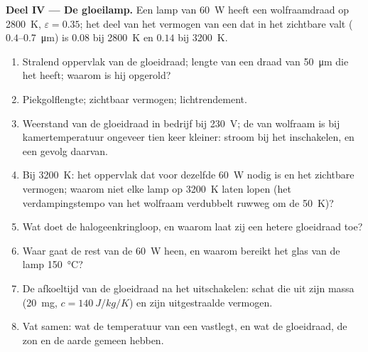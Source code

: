 \begin{problem}
\textbf{Deel IV --- De gloeilamp.}
Een lamp van \qty{60}{W} heeft een wolfraamdraad op \qty{2800}{K},
$\varepsilon = 0.35$; het deel van het vermogen van een  dat in
het zichtbare valt ($0.4$--\qty{0.7}{\micro m}) is $0.08$ bij \qty{2800}{K}
en $0.14$
bij \qty{3200}{K}.
\begin{enumerate}[resume]
  \item Stralend oppervlak van de gloeidraad; lengte van een draad van
        \qty{50}{\micro m}
        die het heeft; waarom is hij opgerold?
  \item Piekgolflengte; zichtbaar vermogen; lichtrendement.
  \item Weerstand van de gloeidraad in bedrijf bij \qty{230}{V};
        de  van wolfraam is bij kamertemperatuur
        ongeveer tien keer kleiner:
        stroom bij het inschakelen, en een gevolg daarvan.
  \item Bij \qty{3200}{K}: het oppervlak dat voor dezelfde \qty{60}{W} nodig is en
        het zichtbare vermogen; waarom niet elke lamp op \qty{3200}{K} laten lopen
        (het verdampingstempo van het wolfraam verdubbelt ruwweg om de
        \qty{50}{K})?
  \item Wat doet de halogeenkringloop, en waarom laat zij een hetere
        gloeidraad toe?
  \item Waar gaat de rest van de \qty{60}{W} heen, en waarom bereikt het glas
        van de lamp \qty{150}{\celsius}?
  \item De afkoeltijd van de gloeidraad na het uitschakelen: schat die uit
        zijn massa (\qty{20}{mg}, $c = \qty{140}{J/kg/K}$) en zijn uitgestraalde
        vermogen.
  \item Vat samen: wat de temperatuur van een  vastlegt, en wat
        de gloeidraad, de zon en de aarde gemeen hebben.
\end{enumerate}
\end{problem}
